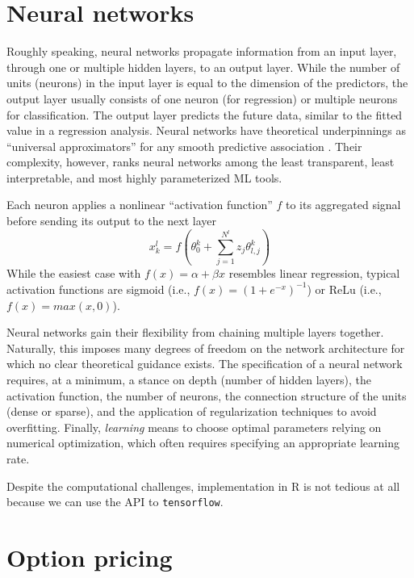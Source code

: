 \documentclass[
]{book}
\begin{document}
\hypertarget{neural-networks}{%
\section{Neural networks}\label{neural-networks}}

Roughly speaking, neural networks propagate information from an input layer, through one or multiple hidden layers, to an output layer. While the number of units (neurons) in the input layer is equal to the dimension of the predictors, the output layer usually consists of one neuron (for regression) or multiple neurons for classification. The output layer predicts the future data, similar to the fitted value in a regression analysis. Neural networks have theoretical underpinnings as ``universal approximators'' for any smooth predictive association \citep{Hornik1991}. Their complexity, however, ranks neural networks among the least transparent, least interpretable, and most highly parameterized ML tools.

Each neuron applies a nonlinear ``activation function'' \(f\) to its aggregated signal before
sending its output to the next layer
\[x_k^l = f\left(\theta^k_{0} + \sum\limits_{j = 1}^{N ^l}z_j\theta_{l,j}^k\right)\]
While the easiest case with \(f(x) = \alpha + \beta x\) resembles linear regression, typical activation functions are sigmoid (i.e., \(f(x) = (1+e^{-x})^{-1}\)) or ReLu (i.e., \(f(x) = max(x, 0)\)).

Neural networks gain their flexibility from chaining multiple layers together. Naturally, this imposes many degrees of freedom on the network architecture for which no clear theoretical guidance exists. The specification of a neural network requires, at a minimum, a stance on depth (number of hidden layers), the activation function, the number of neurons, the connection structure of the units (dense or sparse), and the application of regularization techniques to avoid overfitting. Finally, \emph{learning} means to choose optimal parameters relying on numerical optimization, which often requires specifying an appropriate learning rate.

Despite the computational challenges, implementation in R is not tedious at all because we can use the API to \texttt{tensorflow}.

\hypertarget{option-pricing}{%
\section{Option pricing}\label{option-pricing}}
\end{document}
